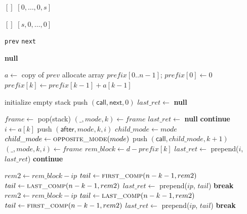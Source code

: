 
\begin{algorithm}
\caption{Gray-composition helpers and non-recursive \texttt{gray\_comp\_next}}
\begin{algorithmic}[1]
    \State \Return $[]$
  \EndIf
  \State \Return $[0,\dots,0,s]$ 
\EndFunction

    \State \Return $[]$
  \EndIf
  \State \Return $[s,0,\dots,0]$ 
\EndFunction

    \State \Return \texttt{prev}
  \Else
    \State \Return \texttt{next}
  \EndIf
\EndFunction

   \State \Return \textbf{null} \EndIf

  \State $a \gets$ copy of $prev$
  \State allocate array $prefix[0..n-1]$; $prefix[0]\gets 0$
    \State $prefix[k] \gets prefix[k-1] + a[k-1]$
  \EndFor

  \State initialize empty stack
  \State push $(\textsf{call}, \textsf{next}, 0)$
  \State $last\_ret \gets$ \textbf{null}

    \State $frame \gets$ pop(stack)
      \State $(\_, mode, k) \gets frame$
        \State $last\_ret \gets$ \textbf{null}
        \State \textbf{continue}
      \EndIf
      \State $i \gets a[k]$
      \State push $(\textsf{after}, mode, k, i)$
        \State $child\_mode \gets mode$
      \Else
        \State $child\_mode \gets \textsc{opposite\_mode}(mode)$
      \EndIf
      \State push $(\textsf{call}, child\_mode, k+1)$
    \Else
      \State $(\_, mode, k, i) \gets frame$
      \State $rem\_block \gets d - prefix[k]$
        \State $last\_ret \gets$ prepend($i$, $last\_ret$)
        \State \textbf{continue}
      \EndIf

          \State $rem2 \gets rem\_block - ip$
            \State $tail \gets \textsc{first\_comp}(n-k-1, rem2)$
          \Else
            \State $tail \gets \textsc{last\_comp}(n-k-1, rem2)$
          \EndIf
          \State $last\_ret \gets$ prepend($ip$, $tail$)
          \State \textbf{break}
        \EndFor
      \Else
          \State $rem2 \gets rem\_block - ip$
            \State $tail \gets \textsc{last\_comp}(n-k-1, rem2)$
          \Else
            \State $tail \gets \textsc{first\_comp}(n-k-1, rem2)$
          \EndIf
          \State $last\_ret \gets$ prepend($ip$, $tail$)
          \State \textbf{break}
        \EndFor
      \EndIf
    \EndIf
  \EndWhile


\end{algorithmic}
\end{algorithm}

